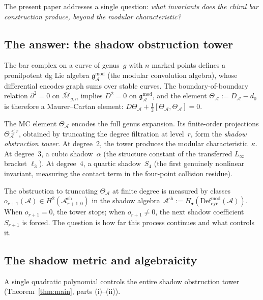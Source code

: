 \documentclass[11pt,reqno]{amsart}
\theoremstyle{definition}
\theoremstyle{remark}
\newcommand{\cA}{\mathcal{A}}
\newcommand{\cM}{\mathcal{M}}
\newcommand{\Defcyc}{\mathrm{Def}_{\mathrm{cyc}}}
\newcommand{\gmod}{\mathfrak{g}^{\mathrm{mod}}_\cA}
\numberwithin{equation}{section}
\begin{document}
The present paper addresses a single question: \emph{what
invariants does the chiral bar construction produce, beyond the
modular characteristic?}

\subsection{The answer: the shadow obstruction tower}

The bar complex on a curve of genus~$g$ with $n$ marked points
defines a pronilpotent dg Lie algebra $\gmod$ (the modular
convolution algebra), whose differential encodes graph sums over
stable curves. The boundary-of-boundary relation
$\partial^2 = 0$ on $\overline{\cM}_{g,n}$ implies $D^2 = 0$ on
$\gmod$, and the element $\Theta_\cA := D_\cA - d_0$ is
therefore a Maurer--Cartan element:
$D \Theta_\cA + \frac{1}{2}[\Theta_\cA, \Theta_\cA] = 0$.

The MC element $\Theta_\cA$ encodes the full genus expansion.
Its finite-order projections $\Theta_\cA^{\le r}$, obtained by
truncating the degree filtration at level~$r$, form the
\emph{shadow obstruction tower}. At degree~$2$, the tower
produces the modular characteristic~$\kappa$. At degree~$3$,
a cubic shadow~$\alpha$ (the structure constant of the transferred
$L_\infty$ bracket $\ell_3$). At degree~$4$, a quartic
shadow~$S_4$ (the first genuinely nonlinear invariant, measuring
the contact term in the four-point collision residue).

The obstruction to truncating $\Theta_\cA$ at finite degree is
measured by classes
$o_{r+1}(\cA) \in H^2(\cA^{\mathrm{sh}}_{r+1,0})$ in the
shadow algebra $\cA^{\mathrm{sh}} := H_\bullet(\Defcyc^{\mathrm{mod}}(\cA))$.
When $o_{r+1} = 0$, the tower stops; when $o_{r+1} \ne 0$, the
next shadow coefficient $S_{r+1}$ is forced. The question is
how far this process continues and what controls it.

\subsection{The shadow metric and algebraicity}

A single quadratic polynomial controls the entire shadow obstruction tower
(Theorem~\ref{thm:main}, parts (i)--(ii)).
\end{document}
